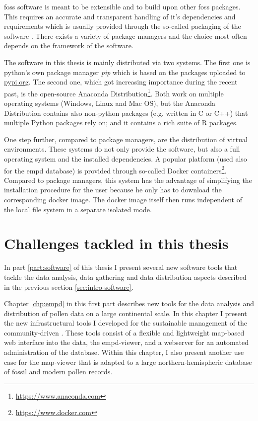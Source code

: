 \begin{refsection}
\gls{foss} software is meant to be extensible and to build upon other \gls{foss} packages. This requires an accurate and transparent handling of it's dependencies and requirements which is usually provided through the so-called packaging of the software \citep[e.g.][]{Torborg2016}. There exists a variety of package managers and the choice most often depends on the framework of the software.

The software in this thesis is mainly distributed via two systems. The first one is python's own package manager \textit{pip} which is based on the packages uploaded to \href{https://pypi.org/}{pypi.org}. The second one, which got increasing importance during the recent past, is the open-source Anaconda Distribution\footnote{\url{https://www.anaconda.com}}. Both work on multiple operating systems (Windows, Linux and Mac OS), but the Anaconda Distribution contains also non-python packages (e.g. written in C or C++) that multiple Python packages rely on; and it contains a rich suite of R packages.

One step further, compared to package managers, are the distribution of virtual environments. These systems do not only provide the software, but also a full operating system and the installed dependencies. A popular platform (used also for the \gls{empd} database) is provided through so-called Docker containers\footnote{\url{https://www.docker.com}}. Compared to package managers, this system has the advantage of simplifying the installation procedure for the user because he only has to download the corresponding docker image. The docker image itself then runs independent of the local file system in a separate isolated mode.



\section{Challenges tackled in this thesis} \label{sec:intro-thesis-overview}

In part \ref{part:software} of this thesis I present several new software tools that tackle the data analysis, data gathering and data distribution aspects described in the previous section \ref{sec:intro-software}. 

Chapter \ref{chp:empd} in this first part describes new tools for the data analysis and distribution of pollen data on a large continental scale. In this chapter I present the new infrastructural tools I developed for the sustainable management of the community-driven . These tools consist of a flexible and lightweight map-based web interface into the data, the \acrshort{empd}-viewer, and a webserver for an automated administration of the database. Within this chapter, I also present another use case for the map-viewer that is adapted to a large northern-hemispheric database of fossil and modern pollen records.


\end{refsection}
